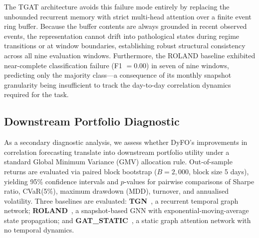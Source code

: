 \documentclass[runningheads]{llncs}
\begin{document}
The TGAT architecture avoids this failure mode entirely by replacing the unbounded recurrent memory with strict multi-head attention over a finite event ring buffer. Because the buffer contents are always grounded in recent observed events, the representation cannot drift into pathological states during regime transitions or at window boundaries, establishing robust structural consistency across all nine evaluation windows. Furthermore, the ROLAND baseline exhibited near-complete classification failure (F1 $= 0.00$) in seven of nine windows, predicting only the majority class---a consequence of its monthly snapshot granularity being insufficient to track the day-to-day correlation dynamics required for the task.


\subsection{Downstream Portfolio Diagnostic}\label{portfolio_level_eval}

As a secondary diagnostic analysis, we assess whether DyFO's improvements in correlation forecasting translate into downstream portfolio utility under a standard Global Minimum Variance (GMV) allocation rule. Out-of-sample returns are evaluated via paired block bootstrap ($B = 2{,}000$, block size 5 days), yielding 95\% confidence intervals and $p$-values for pairwise comparisons of Sharpe ratio, CVaR(5\%), maximum drawdown (MDD), turnover, and annualised volatility. Three baselines are evaluated: \textbf{TGN}~\cite{rossi2020temporal}, a recurrent temporal graph network; \textbf{ROLAND}~\cite{you2022roland}, a snapshot-based GNN with exponential-moving-average state propagation; and \textbf{GAT\_STATIC}~\cite{velickovic2018graph},
a static graph attention network with no temporal dynamics.

\end{document}
